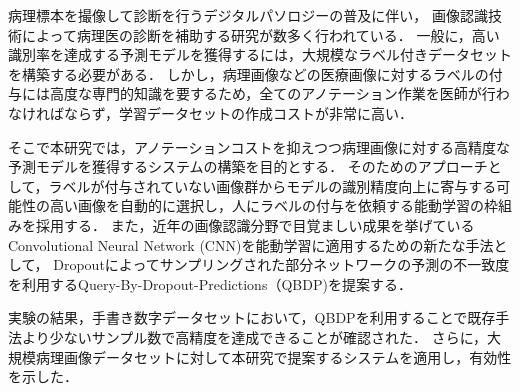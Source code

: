 病理標本を撮像して診断を行うデジタルパソロジーの普及に伴い，
画像認識技術によって病理医の診断を補助する研究が数多く行われている．
一般に，高い識別率を達成する予測モデルを獲得するには，大規模なラベル付きデータセットを構築する必要がある．
しかし，病理画像などの医療画像に対するラベルの付与には高度な専門的知識を要するため，全てのアノテーション作業を医師が行わなければならず，学習データセットの作成コストが非常に高い．

そこで本研究では，アノテーションコストを抑えつつ病理画像に対する高精度な予測モデルを獲得するシステムの構築を目的とする．
そのためのアプローチとして，ラベルが付与されていない画像群からモデルの識別精度向上に寄与する可能性の高い画像を自動的に選択し，人にラベルの付与を依頼する能動学習の枠組みを採用する．
また，近年の画像認識分野で目覚ましい成果を挙げているConvolutional Neural Network (CNN)を能動学習に適用するための新たな手法として，
Dropoutによってサンプリングされた部分ネットワークの予測の不一致度を利用するQuery-By-Dropout-Predictions（QBDP)を提案する．

実験の結果，手書き数字データセットにおいて，QBDPを利用することで既存手法より少ないサンプル数で高精度を達成できることが確認された．
さらに，大規模病理画像データセットに対して本研究で提案するシステムを適用し，有効性を示した．
